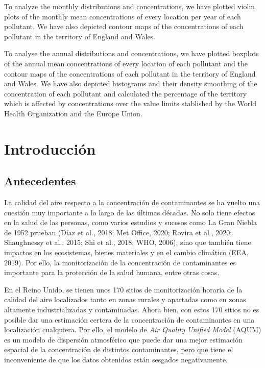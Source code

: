 \documentclass[12pt]{article}
\begin{document}
To analyze the monthly distributions and concentrations, we have plotted violin plots of the monthly mean concentrations of every location per year of each pollutant. We have also depicted contour maps of the concentrations of each pollutant in the territory of England and Wales.

To analyse the annual distributions and concentrations, we have plotted boxplots of the annual mean concentrations of every location of each pollutant and the contour maps of the concentrations of each pollutant in the territory of England and Wales. We have also depicted histograms and their density smoothing of the concentration of each pollutant and calculated the percentage of the territory which is affected by concentrations over the value limits stablished by the World Health Organization and the Europe Union.

\newpage


\section{Introducción}

\normalsize

\subsection{Antecedentes}

La calidad del aire respecto a la concentración de contaminantes se ha vuelto una cuestión muy importante a lo largo de las últimas décadas. No solo tiene efectos en la salud de las personas, como varios estudios y sucesos como La Gran Niebla de 1952 prueban (Díaz et al., 2018; Met Office, 2020; Rovira et al., 2020; Shaughnessy et al., 2015; Shi et al., 2018; WHO, 2006), sino que también tiene impactos en los ecosistemas, bienes materiales y en el cambio climático (EEA, 2019). Por ello, la monitorización de la concentración de contaminantes es importante para la protección de la salud humana, entre otras cosas.

En el Reino Unido, se tienen unos 170 sitios de monitorización horaria de la calidad del aire localizados tanto en zonas rurales y apartadas como en zonas altamente industrializadas y contaminadas. Ahora bien, con estos 170 sitios no es posible dar una estimación certera de la concentración de contaminantes en una localización cualquiera. Por ello, el modelo de \textit{Air Quality Unified Model} (AQUM) es un modelo de dispersión atmosférico que puede dar una mejor estimación espacial de la concentración de distintos contaminantes, pero que tiene el inconveniente de que los datos obtenidos están sesgados negativamente.
\end{document}
